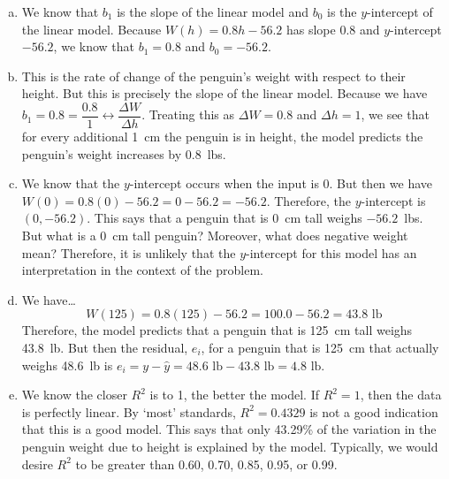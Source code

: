 \documentclass[11pt,letterpaper]{article}
\begin{document}
\sol
\begin{enumerate}[(a)]
\item We know that $b_1$ is the slope of the linear model and $b_0$ is the $y$-intercept of the linear model. Because $W(h)= 0.8h - 56.2$ has slope 0.8 and $y$-intercept $-56.2$, we know that $b_1= 0.8$ and $b_0= -56.2$. \pspace

\item This is the rate of change of the penguin's weight with respect to their height. But this is precisely the slope of the linear model. Because we have $b_1= 0.8= \dfrac{0.8}{1} \leftrightarrow \dfrac{\Delta W}{\Delta h}$. Treating this as $\Delta W= 0.8$ and $\Delta h= 1$, we see that for every additional 1~cm the penguin is in height, the model predicts the penguin's weight increases by 0.8~lbs. \pspace

\item We know that the $y$-intercept occurs when the input is 0. But then we have $W(0)= 0.8(0) - 56.2= 0 - 56.2= -56.2$. Therefore, the $y$-intercept is $(0, -56.2)$. This says that a penguin that is 0~cm tall weighs $-56.2$~lbs. But what is a 0~cm tall penguin? Moreover, what does negative weight mean? Therefore, it is unlikely that the $y$-intercept for this model has an interpretation in the context of the problem. \pspace

\item We have\dots
	\[
	W(125)= 0.8(125) - 56.2= 100.0 - 56.2= 43.8 \text{ lb}
	\]
Therefore, the model predicts that a penguin that is 125~cm tall weighs 43.8~lb. But then the residual, $e_i$, for a penguin that is 125~cm that actually weighs 48.6~lb is $e_i= y - \widehat{y}= 48.6 \text{ lb} - 43.8 \text{ lb}= 4.8 \text{ lb}$. \pspace

\item We know the closer $R^2$ is to 1, the better the model. If $R^2= 1$, then the data is perfectly linear. By `most' standards, $R^2= 0.4329$ is not a good indication that this is a good model. This says that only 43.29\% of the variation in the penguin weight due to height is explained by the model. Typically, we would desire $R^2$ to be greater than 0.60, 0.70, 0.85, 0.95, or 0.99.

\end{enumerate}
\end{document}
